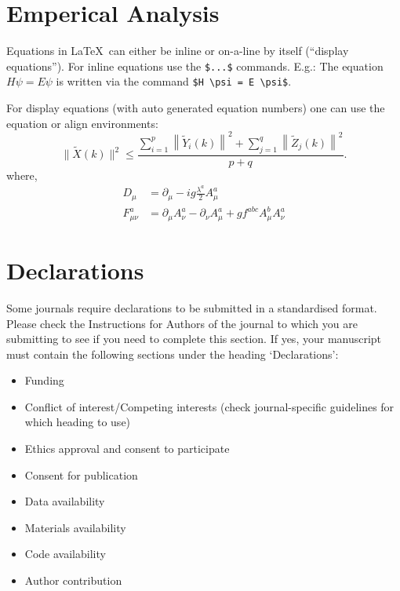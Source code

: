 \documentclass[sn-mathphys-num]{sn-jnl}%
\theoremstyle{thmstyleone}%
\theoremstyle{thmstyletwo}%
\theoremstyle{thmstylethree}%
\begin{document}
\begin{filecontents*}{}


\section{Emperical Analysis}



Equations in \LaTeX\ can either be inline or on-a-line by itself (``display equations''). For
inline equations use the \verb+$...$+ commands. E.g.: The equation
$H\psi = E \psi$ is written via the command \verb+$H \psi = E \psi$+.

For display equations (with auto generated equation numbers)
one can use the equation or align environments:
\begin{equation}
    \|\tilde{X}(k)\|^2 \leq\frac{\sum\limits_{i=1}^{p}\left\|\tilde{Y}_i(k)\right\|^2+\sum\limits_{j=1}^{q}\left\|\tilde{Z}_j(k)\right\|^2 }{p+q}.\label{eq1}
\end{equation}
where,
\begin{align}
    D_\mu        & =  \partial_\mu - ig \frac{\lambda^a}{2} A^a_\mu \nonumber                            \\
    F^a_{\mu\nu} & = \partial_\mu A^a_\nu - \partial_\nu A^a_\mu + g f^{abc} A^b_\mu A^a_\nu \label{eq2}
\end{align}

\section*{Declarations}

Some journals require declarations to be submitted in a standardised format. Please check the Instructions for Authors of the journal to which you are submitting to see if you need to complete this section. If yes, your manuscript must contain the following sections under the heading `Declarations':

\begin{itemize}
    \item Funding
    \item Conflict of interest/Competing interests (check journal-specific guidelines for which heading to use)
    \item Ethics approval and consent to participate
    \item Consent for publication
    \item Data availability
    \item Materials availability
    \item Code availability
    \item Author contribution
\end{itemize}


\end{filecontents*}
\end{document}
